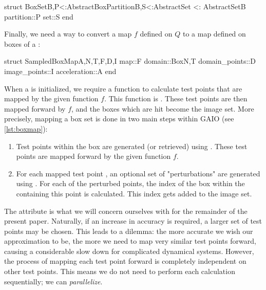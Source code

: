 \begin{minipage}{\linewidth}
\begin{jllisting}[language=julia, style=jlcodestyle]
    struct BoxSet{B,P<:AbstractBoxPartition{B},S<:AbstractSet} <: AbstractSet{B}
        partition::P
        set::S
    end
\end{jllisting}    
\end{minipage}

Finally, we need a way to convert a map $f$ defined on $Q$ to a map  defined on 
boxes of a :

\begin{minipage}{\linewidth}
\begin{jllisting}[language=julia, style=jlcodestyle]
    struct SampledBoxMap{A,N,T,F,D,I}
        map::F
        domain::Box{N,T}
        domain_points::D
        image_points::I
        acceleration::A
    end
\end{jllisting}
\end{minipage}

When a  is initialized, we require a function to calculate test 
points that are mapped by the given function $f$. This function is . These test 
points are then mapped forward by $f$, and the boxes which are hit become the image set.
More precisely, mapping a box set is done in two main steps within GAIO (see 
\autoref{lst:boxmap}):

\begin{enumerate}
    \item Test points within the box are generated (or retrieved) 
    using . These test points are mapped 
    forward by the given function $f$.
    \item For each mapped test point , an optional set of "perturbations" are 
    generated using . For each of the perturbed points, 
    the index of the box within the  containing this point is calculated. 
    This index gets added to the image set. \\
\end{enumerate}

The  attribute is what we will concern ourselves with for the remainder 
of the present paper. Naturally, if an increase in accuracy is required, a larger set of 
test points may be chosen. This leads to a dilemma: the more accurate we wish our 
approximation  to be, the more we need to map very similar test points forward,
causing a considerable slow down for complicated dynamical systems. However, the process of
mapping each test point forward is completely independent on other test points. This means 
we do not need to perform each calculation sequentially; we can \emph{parallelize}. 

